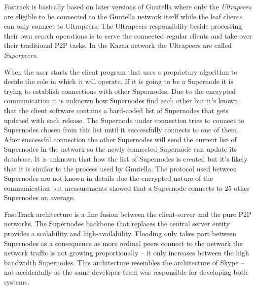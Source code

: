 \documentclass[a4paper]{article}
\begin{document}
Fastrack is basically based on later versions of Gnutella where only the \emph{Ultrapeers} are eligible to be connected
to the Gnutella network itself while the leaf clients can only connect to Ultrapeers. The Ultrapeers responsiblity
beside processing their own search operations is to serve the connected regular clients and take over their traditional
P2P tasks. In the Kazaa network the Ultrapeers are called \emph{Superpeers}.

When the user starts the client program that uses a proprietary algorithm to decide the role in which it will operate.
If it is going to be a Supernode it is trying to establish connections with other Supernodes. Due to the encrypted
communication it is unknown how Supernodes find each other but it's known that the client software contains a
hard-coded list of Supernodes that gets updated with each release. The Supernode under connection tries to connect to
Supernodes chosen from this list until it successfully connects to one of them. After successful connection the other
Supernodes will send the current list of Supernodes in the network so the newly connected Supernode can update its
database. It is unknown that how the list of Supernodes is created but it's likely that it is similar to the process
used by Gnutella. The protocol used between Supernodes are not known in details due the encrypted nature of the
communication but measurements showed that a Supernode connects to 25 other Supernodes on average.

FastTrack architecture is a fine fusion between the client-server and the pure P2P networks. The Supernodes backbone
that replaces the central server entity provides a scalability and high-availability. Flooding only takes part between
Supernodes as a consequence as more ordinal peers connect to the network the network traffic is not growing
proportionally -- it only increases between the high bandwidth Supernodes. This architecture resembles the architecture
of Skype -- not accidentally as the same developer team was responsible for developing both systems.
\end{document}
